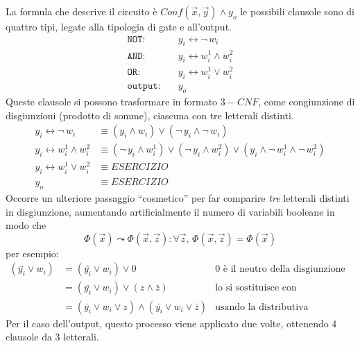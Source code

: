 La formula che descrive il circuito è
$
    Conf \left( \vec{x}, \vec{y} \right) \wedge y_o
$
le possibili clausole sono di quattro tipi, legate alla tipologia di gate e all'output.
\begin{align*}
    \texttt{NOT:} & \quad y_i \leftrightarrow \neg \, w_i \\
    \texttt{AND:} & \quad y_i \leftrightarrow w_i^1 \wedge w_i^2 \\
    \texttt{OR:} & \quad y_i \leftrightarrow w_i^1 \vee w_i^2 \\
    \texttt{output:} & \quad y_o
\end{align*}
Queste clausole si possono trasformare in formato $3-CNF$, come congiunzione di disgiunzioni (prodotto di somme), ciascuna con tre letterali distinti.
\begin{align*}
    y_i \leftrightarrow \neg \, w_i & \equiv
    \left( y_i \wedge w_i \right)
    \vee
    \left( \neg \, y_i \wedge \neg \, w_i \right)
    \\
    y_i \leftrightarrow w_i^1 \wedge w_i^2 & \equiv
    \left( \neg \, y_i \wedge w_i^1 \right)
    \vee
    \left( \neg \, y_i \wedge w_i^2 \right)
    \vee
    \left( y_i \wedge \neg \, w_i^1 \wedge \neg \, w_i^2 \right)
    \\
    y_i \leftrightarrow w_i^1 \vee w_i^2 & \equiv ESERCIZIO\\
    y_o & \equiv ESERCIZIO
\end{align*}
Occorre un ulteriore passaggio ``cosmetico'' per far comparire \emph{tre} letterali distinti in disgiunzione, aumentando artificialmente il numero di variabili booleane in modo che
\begin{equation*}
    \Phi \left( \vec{x} \right)
    \leadsto
    \Phi \left( \vec{x}, \vec{z} \right)
    : \forall \vec{z}, \,
    \Phi \left( \vec{x}, \vec{z} \right)
    =
    \Phi \left( \vec{x} \right)
\end{equation*}
per esempio:
\begin{align*}
    \left( \bar{y_i} \vee w_i \right)
    &= 
    \left( \bar{y_i} \vee w_i \right)
    \vee 0
    & 0 \text{ è il neutro della disgiunzione} &
    \\
    &= 
    \left( \bar{y_i} \vee w_i \right)
    \vee
    \left( z \wedge \bar{z} \right)
    & \text{lo si sostituisce con contraddizione} &
    \\
    &= 
    \left( \bar{y_i} \vee w_i \vee z \right)
    \wedge
    \left( \bar{y_i} \vee w_i \vee \bar{z} \right)
    & \text{usando la distributiva} &
\end{align*}
Per il caso dell'output, questo processo viene applicato due volte, ottenendo 4 clausole da 3 letterali.

